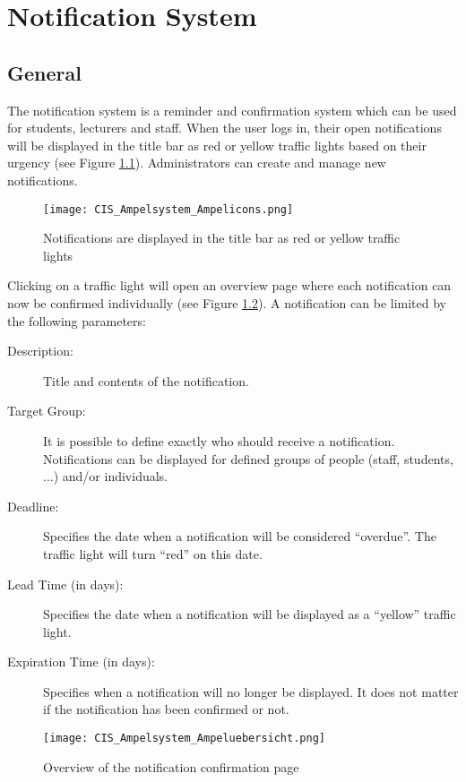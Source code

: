 \chapter{Notification System}
\label{kapitel_ampelsystem}

\section{General}

The notification system is a reminder and confirmation system which can be used for students, lecturers and staff.
When the user logs in, their open notifications will be displayed in the title bar as red or yellow traffic lights based on their urgency (see Figure \ref{ampel_icons}).
Administrators can create and manage new notifications.

\begin{figure}
	\centering
	\texttt{[image: CIS\_Ampelsystem\_Ampelicons.png]}
	\caption{Notifications are displayed in the title bar as red or yellow traffic lights}
	\label{ampel_icons}
\end{figure}

Clicking on a traffic light will open an overview page where each notification can now be confirmed individually (see Figure \ref{ampel_uebersicht}).
A notification can be limited by the following parameters:
\begin{description}

	\item[Description:] Title and contents of the notification.
	\item[Target Group:] It is possible to define exactly who should receive a notification. Notifications can be displayed for defined groups of people (staff, students, ...) and/or individuals.
	\item[Deadline:] Specifies the date when a notification will be considered "`overdue"'. The traffic light will turn "`red"' on this date.
	\item[Lead Time (in days):] Specifies the date when a notification will be displayed as a "`yellow"' traffic light.
	\item[Expiration Time (in days):] Specifies when a notification will no longer be displayed. It does not matter if the notification has been confirmed or not.
\end{description}

\begin{figure}
	\centering
	\texttt{[image: CIS\_Ampelsystem\_Ampeluebersicht.png]}
	\caption {Overview of the notification confirmation page}
	\label{ampel_uebersicht}
\end{figure}

